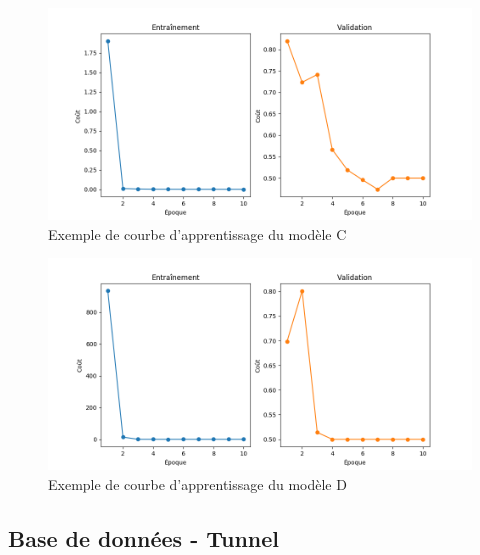    \begin{figure}[H]
        \centering
        \includegraphics[width=16cm]{images/learning_curves_c.png}
        \caption{Exemple de courbe d'apprentissage du modèle C}
        \label{fig:learning_curves_c}
    \end{figure}

    \begin{figure}[H]
        \centering
        \includegraphics[width=16cm]{images/learning_curves_d.png}
        \caption{Exemple de courbe d'apprentissage du modèle D}
        \label{fig:learning_curves_d}
    \end{figure}

\subsection{Base de données - Tunnel}

